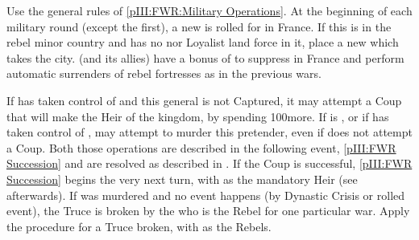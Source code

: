 \begin{digressions}



  \phmil
  \aparag Use the general rules of \ref{pIII:FWR:Military Operations}.
  \aparag At the beginning of each military round (except the first), a new
  \REVOLT is rolled for in France. If this \REVOLT is in the rebel minor
  country and has no \REVOLT nor Loyalist land force in it, place a new
  \REVOLT \facemoins which takes the city.
  \aparag \FRA (and its allies) have a bonus of  to suppress \REVOLT
  in France and perform automatic surrenders of rebel fortresses as in the
  previous wars.



  \phpaix
  \aparag If \LIG has taken control of  and this
  general is not Captured, it may attempt a Coup that will make  the Heir of the kingdom, by spending 100\ducats more.
  \aparag If \FRA is \CATHCO, or if \LIG has taken control of , \FRA may attempt to murder this pretender, even if \LIG does not
  attempt a Coup.
  \aparag Both those operations are described in the following event,
  \ref{pIII:FWR Succession} and are resolved as described in
  .
  \bparag If the Coup is successful, \ref{pIII:FWR Succession} begins the very
  next turn, with  as the mandatory Heir (see
  afterwards).
  \bparag If  was murdered and no event
   happens (by Dynastic Crisis or rolled event), the Truce
  is broken by the \lig who is the Rebel for one particular war. Apply the
  procedure for a Truce broken, with \lig as the Rebels.
\end{digressions}


